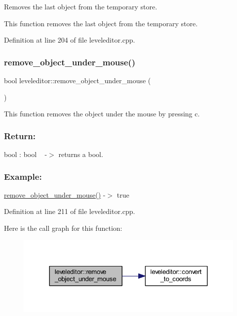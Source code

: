 Removes the last object from the temporary store. 

This function removes the last object from the temporary store. 

Definition at line 204 of file leveleditor.\+cpp.

\mbox{\label{classleveleditor_a89e3b4fb65aa6db692a2f4db65e6dba2}} 
\subsubsection{\texorpdfstring{remove\+\_\+object\+\_\+under\+\_\+mouse()}{remove\_object\_under\_mouse()}}
{\footnotesize\ttfamily bool leveleditor\+::remove\+\_\+object\+\_\+under\+\_\+mouse (\begin{DoxyParamCaption}{ }\end{DoxyParamCaption})\hspace{0.3cm}{\ttfamily [private]}}



This function removes the object under the mouse by pressing c. 

\subsubsection*{Return\+: }

bool \+: bool ~\newline
-\/$>$ returns a bool.

\subsubsection*{Example\+: }

\hyperlink{classleveleditor_a89e3b4fb65aa6db692a2f4db65e6dba2}{remove\+\_\+object\+\_\+under\+\_\+mouse()} -\/$>$ true 

Definition at line 211 of file leveleditor.\+cpp.

Here is the call graph for this function\+:
\nopagebreak
\begin{figure}[H]
\begin{center}
\leavevmode
\includegraphics[width=324pt]{classleveleditor_a89e3b4fb65aa6db692a2f4db65e6dba2_cgraph}
\end{center}
\end{figure}
\mbox{\label{classleveleditor_a6579d63ca18e84f7a335bf8072f798cc}} 
